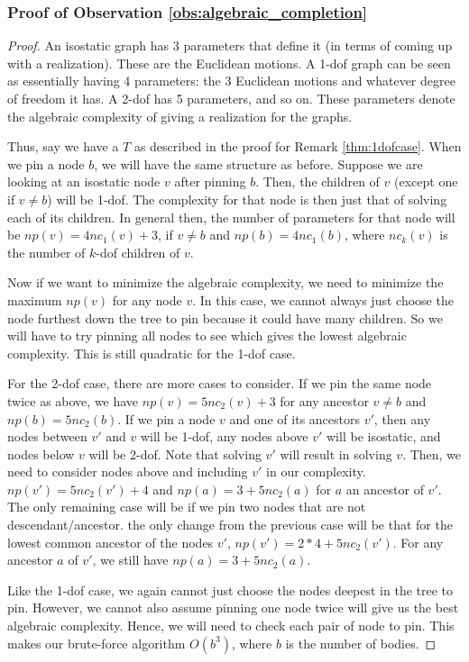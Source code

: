 \subsubsection{Proof of Observation \ref{obs:algebraic_completion}}
\begin{proof}
    An isostatic graph has 3 parameters that define it (in terms of coming up with a realization). These are the Euclidean motions. A 1-dof graph can be seen as essentially having 4 parameters: the 3 Euclidean motions and whatever degree of freedom it has. A 2-dof has 5 parameters, and so on. These parameters denote the algebraic complexity of giving a realization for the graphs.

    Thus, say we have a $T$ as described in the proof for Remark \ref{thm:1dofcase}. When we pin a node $b$, we will have the same structure as before. Suppose we are looking at an isostatic node $v$ after pinning $b$. Then, the children of $v$ (except one if $v \neq b$) will be 1-dof. The complexity for that node is then just that of solving each of its children. In general then, the number of parameters for that node will be $np(v) = 4nc_1(v)+3$, if $v \neq b$ and $np(b) = 4nc_1(b)$, where $nc_k(v)$ is the number of $k$-dof children of $v$.

    Now if we want to minimize the algebraic complexity, we need to minimize the maximum $np(v)$ for any node $v$. In this case, we cannot always just choose the node furthest down the tree to pin because it could have many children. So we will have to try pinning all nodes to see which gives the lowest algebraic complexity. This is still quadratic for the 1-dof case.

    For the 2-dof case, there are more cases to consider. If we pin the same node twice as above, we have $np(v) = 5nc_2(v)+3$ for any ancestor $v \neq b$ and $np(b) = 5nc_2(b)$. If we pin a node $v$ and one of its ancestors $v'$, then any nodes between $v'$ and $v$ will be 1-dof, any nodes above $v'$ will be isostatic, and nodes below $v$ will be 2-dof. Note that solving $v'$ will result in solving $v$. Then, we need to consider nodes above and including $v'$ in our complexity. $np(v') = 5nc_2(v') + 4$ and $np(a) = 3 + 5nc_2(a)$ for $a$ an ancestor of $v'$. The only remaining case will be if we pin two nodes that are not descendant/ancestor. the only change from the previous case will be that for the lowest common ancestor of the nodes $v'$, $np(v') = 2*4+5nc_2(v')$. For any ancestor $a$ of $v'$, we still have $np(a) = 3 + 5nc_2(a)$.

    Like the 1-dof case, we again cannot just choose the nodes deepest in the tree to pin. However, we cannot also assume pinning one node twice will give us the best algebraic complexity. Hence, we will need to check each pair of node to pin. This makes our brute-force algorithm $O(b^3)$, where $b$ is the number of bodies.
\end{proof}




